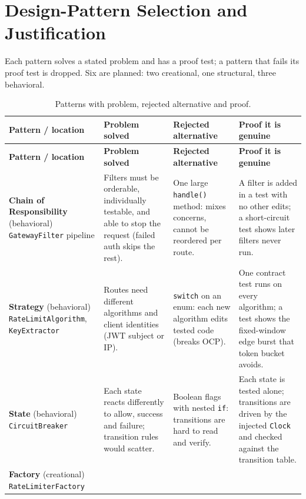 \documentclass[12pt,a4paper]{article}
\newcommand{\cls}[1]{\nolinkurl{#1}}
\begin{document}
\section{Design-Pattern Selection and Justification}
\label{sec:patterns}
Each pattern solves a stated problem and has a proof test; a pattern that fails its proof test is dropped. Six are planned: two creational, one structural, three behavioral.

\begingroup
\small
\setlength{\tabcolsep}{4pt}
\begin{longtable}{L{2.9cm} L{3.5cm} L{3.5cm} L{3.9cm}}
\caption{Patterns with problem, rejected alternative and proof.}\\
\toprule
\textbf{Pattern / location} & \textbf{Problem solved} & \textbf{Rejected alternative} & \textbf{Proof it is genuine} \\
\midrule
\endfirsthead
\toprule
\textbf{Pattern / location} & \textbf{Problem solved} & \textbf{Rejected alternative} & \textbf{Proof it is genuine} \\
\midrule
\endhead
\textbf{Chain of Responsibility} (behavioral) \newline \cls{GatewayFilter} pipeline &
Filters must be orderable, individually testable, and able to stop the request (failed auth skips the rest). &
One large \cls{handle()} method: mixes concerns, cannot be reordered per route. &
A filter is added in a test with no other edits; a short-circuit test shows later filters never run. \\
\textbf{Strategy} (behavioral) \newline \cls{RateLimitAlgorithm}, \cls{KeyExtractor} &
Routes need different algorithms and client identities (JWT subject or IP). &
\cls{switch} on an enum: each new algorithm edits tested code (breaks OCP). &
One contract test runs on every algorithm; a test shows the fixed-window edge burst that token bucket avoids. \\
\textbf{State} (behavioral) \newline \cls{CircuitBreaker} &
Each state reacts differently to allow, success and failure; transition rules would scatter. &
Boolean flags with nested \cls{if}: transitions are hard to read and verify. &
Each state is tested alone; transitions are driven by the injected \cls{Clock} and checked against the transition table. \\
\textbf{Factory} (creational) \newline \cls{RateLimiterFactory} &

\end{longtable}
\end{document}
